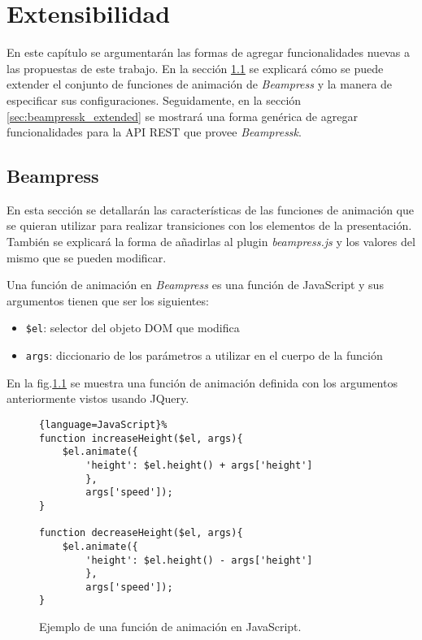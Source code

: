 \chapter{Extensibilidad} %
\label{cha:extensibilidad}
 	En este capítulo se argumentarán las formas de agregar funcionalidades nuevas a las propuestas de este trabajo. En la sección \ref{sec:beampress_extended} se explicará cómo se puede extender el conjunto de funciones de animación de \textit{Beampress} y la manera de especificar sus configuraciones. Seguidamente, en la sección \ref{sec:beampressk_extended} se mostrará una forma genérica de agregar funcionalidades para la API REST que provee \textit{Beampressk}.  

	\section{Beampress} %
	\label{sec:beampress_extended}
		En esta sección se detallarán las características de las funciones de animación que se quieran utilizar para realizar transiciones con los elementos de la presentación. También se explicará la forma de añadirlas al plugin \textit{beampress.js} y los valores del mismo que se pueden modificar.

		Una función de animación en \textit{Beampress} es una función de JavaScript y sus argumentos tienen que ser los siguientes:

		\begin{itemize}
			\item \texttt{\$el}: selector del objeto DOM que modifica
			\item \texttt{args}: diccionario de los parámetros a utilizar en el cuerpo de la función
		\end{itemize}

		En la fig.\ref{fig:javascript_animation} se muestra una función de animación definida con los argumentos anteriormente vistos usando JQuery.

		\begin{figure}[htb]%
			\begin{lstlisting}{language=JavaScript}%
function increaseHeight($el, args){
    $el.animate({
    	'height': $el.height() + args['height'] 
    	}, 
    	args['speed']);
}

function decreaseHeight($el, args){
    $el.animate({
    	'height': $el.height() - args['height'] 
    	}, 
    	args['speed']);
}      
			\end{lstlisting}
		\caption{Ejemplo de una función de animación en JavaScript.} 
		\label{fig:javascript_animation} 
		\end{figure}		


